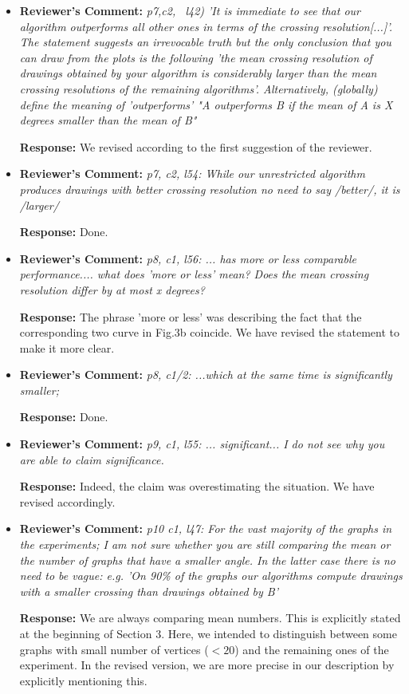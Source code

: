 \documentclass{article}
\newcommand{\rcomment}[1]{\vspace{0.3cm} \item \textbf{Reviewer's Comment:} {\em #1}}
\newcommand{\response}{\vspace{0.2cm} \textbf{Response: }}
\begin{document}
\begin{itemize}
\response{We agree with the reviewer that some of our statements might be questionable. So, in the following, we have addressed each of the reviewer's specific comments in order to improve the presentation.}

\rcomment{p7,c2, ~l42) 'It is immediate to see that our algorithm outperforms all other ones in terms of the crossing resolution[...]'. The statement suggests an irrevocable truth but the only conclusion that you can draw from the plots is the following 'the mean crossing resolution of drawings obtained by your algorithm is considerably larger than the mean crossing resolutions of the remaining algorithms'. Alternatively, (globally) define the meaning of 'outperforms' "A outperforms B if the mean of A is X degrees smaller than the mean of B"}

\response{We revised according to the first suggestion of the reviewer.}

\rcomment{p7, c2, l54: While our unrestricted algorithm produces drawings with better crossing resolution no need to say /better/, it is /larger/}

\response{Done.}

\rcomment{p8, c1, l56: ... has more or less comparable performance.... what does 'more or less' mean? Does the mean crossing resolution differ by at most x degrees?}

\response{The phrase 'more or less' was describing the fact that the corresponding two curve in Fig.3b coincide. We have revised the statement to make it more clear.}

\rcomment{p8, c1/2: ...which at the same time is significantly smaller;}

\response{Done.}

\rcomment{p9, c1, l55: ... significant... I do not see why you are able to claim significance.}

\response{Indeed, the claim was overestimating the situation. We have revised accordingly.}

\rcomment{p10 c1, l47: For the vast majority of the graphs in the experiments; I am not sure whether you are still comparing the mean or the number of graphs that have a smaller angle. In the latter case there is no need to be vague: e.g. 'On 90\% of the graphs our algorithms compute drawings with a smaller crossing than drawings obtained by B'}

\response{We are always comparing mean numbers. This is explicitly stated at the beginning of Section 3. Here, we intended to distinguish between some graphs with small number of vertices ($<20$) and the remaining ones of the experiment. In the revised version, we are more precise in our description by explicitly mentioning this. }



\end{itemize}
\end{document}

